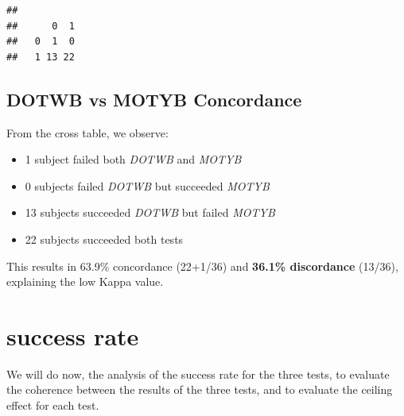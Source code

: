 \documentclass[
]{article}
\providecommand{\tightlist}{%
  \setlength{\itemsep}{0pt}\setlength{\parskip}{0pt}}
\begin{document}
\begin{verbatim}
##    
##      0  1
##   0  1  0
##   1 13 22
\end{verbatim}

\subsection{DOTWB vs MOTYB
Concordance}\label{dotwb-vs-motyb-concordance}

From the cross table, we observe:

\begin{itemize}
\tightlist
\item
  1 subject failed both \emph{DOTWB} and \emph{MOTYB}\\
\item
  0 subjects failed \emph{DOTWB} but succeeded \emph{MOTYB}
\item
  13 subjects succeeded \emph{DOTWB} but failed \emph{MOTYB}
\item
  22 subjects succeeded both tests
\end{itemize}

This results in 63.9\% concordance (22+1/36) and \textbf{36.1\%
discordance} (13/36), explaining the low Kappa value.

\section{success rate}\label{success-rate}

We will do now, the analysis of the success rate for the three tests, to
evaluate the coherence between the results of the three tests, and to
evaluate the ceiling effect for each test.
\end{document}

